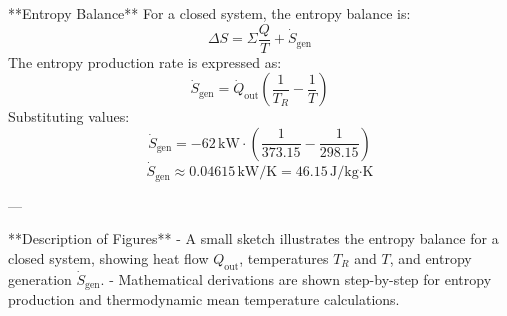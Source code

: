 **Entropy Balance**  
For a closed system, the entropy balance is:  
\[
\Delta S = \Sigma \frac{Q}{T} + \dot{S}_{\text{gen}}
\]  
The entropy production rate is expressed as:  
\[
\dot{S}_{\text{gen}} = \dot{Q}_{\text{out}} \left( \frac{1}{T_R} - \frac{1}{T} \right)
\]  
Substituting values:  
\[
\dot{S}_{\text{gen}} = -62 \, \text{kW} \cdot \left( \frac{1}{373.15} - \frac{1}{298.15} \right)
\]  
\[
\dot{S}_{\text{gen}} \approx 0.04615 \, \text{kW/K} = 46.15 \, \text{J/kg·K}
\]  

---

**Description of Figures**  
- A small sketch illustrates the entropy balance for a closed system, showing heat flow \( Q_{\text{out}} \), temperatures \( T_R \) and \( T \), and entropy generation \( \dot{S}_{\text{gen}} \).  
- Mathematical derivations are shown step-by-step for entropy production and thermodynamic mean temperature calculations.